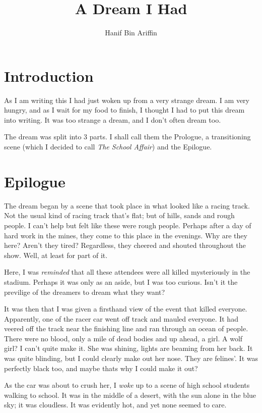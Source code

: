\documentclass[a4paper,10pt]{article}
\title{A Dream I Had}
\author{Hanif Bin Ariffin}
\begin{document}
\maketitle

\section{Introduction}

As I am writing this I had just woken up from a very strange dream.
I am very hungry, and as I wait for my food to finish, I thought I had to put this dream into writing.
It was too strange a dream, and I don't often dream too.

The dream was split into 3 parts.
I shall call them the Prologue, a transitioning scene (which I decided to call \textit{The School Affair}) and the Epilogue.

\section{Epilogue}

The dream began by a scene that took place in what looked like a racing track.
Not the usual kind of racing track that's flat; but of hills, sands and rough people.
I can't help but felt like these were rough people.
Perhaps after a day of hard work in the mines, they come to this place in the evenings.
Why are they here?
Aren't they tired?
Regardless, they cheered and shouted throughout the show.
Well, at least for part of it.

Here, I was \textit{reminded} that all these attendees were all killed mysteriously in the stadium.
Perhaps it was only as an aside, but I was too curious.
Isn't it the previlige of the dreamers to dream what they want?

It was then that I was given a firsthand view of the event that killed everyone.
Apparently, one of the racer car went off track and mauled everyone.
It had veered off the track near the finishing line and ran through an ocean of people.
There were no blood, only a mile of dead bodies and up ahead, a girl.
A wolf girl?
I can't quite make it.
She was shining, lights are beaming from her back.
It was quite blinding, but I could clearly make out her nose.
They are felines'.
It was perfectly black too, and maybe thats why I could make it out?

As the car was about to crush her, I \textit{woke} up to a scene of high school students walking to school.
It was in the middle of a desert, with the sun alone in the blue sky; it was cloudless.
It was evidently hot, and yet none seemed to care.
\end{document}
